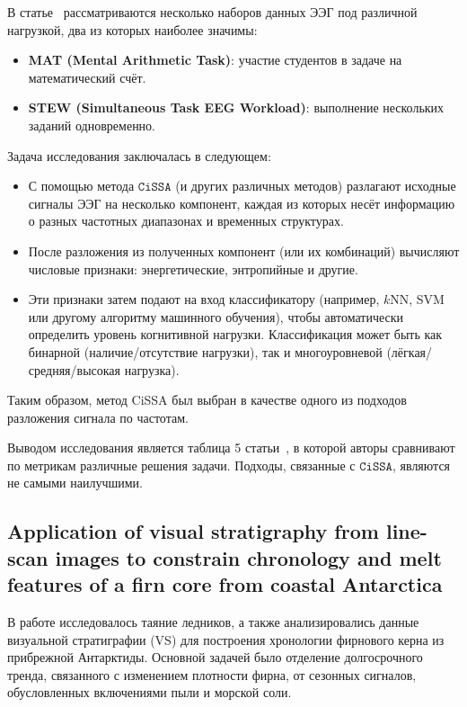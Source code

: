 \documentclass[12pt, specialist, subf
]{disser}
\theoremstyle{definition}
\newcommand{\CISSA}{\texttt{CiSSA}}
\begin{document}
В статье~\cite{cognitive} рассматриваются несколько наборов данных ЭЭГ под различной нагрузкой, два из которых наиболее значимы:

\begin{itemize}
	\item \textbf{MAT (Mental Arithmetic Task)}: участие студентов в задаче на математический счёт.
	\item \textbf{STEW (Simultaneous Task EEG Workload)}: выполнение нескольких заданий одновременно.
\end{itemize}

Задача исследования заключалась в следующем:

\begin{itemize}
	\item С помощью метода $\CISSA$ (и других различных методов) разлагают исходные сигналы ЭЭГ на несколько компонент, каждая из которых несёт информацию о разных частотных диапазонах и временных структурах.
	\item После разложения из полученных компонент (или их комбинаций) вычисляют числовые признаки: энергетические, энтропийные и другие.
	\item Эти признаки затем подают на вход классификатору (например, $k$NN, SVM или другому алгоритму машинного обучения), чтобы автоматически определить уровень когнитивной нагрузки. Классификация может быть как бинарной (наличие/отсутствие нагрузки), так и многоуровневой (лёгкая/средняя/высокая нагрузка).
\end{itemize}

Таким образом, метод CiSSA был выбран в качестве одного из подходов разложения сигнала по частотам.

Выводом исследования является таблица 5 статьи~\cite{cognitive}, в которой авторы сравнивают по метрикам различные решения задачи. Подходы, связанные с $\CISSA$, являются не самыми наилучшими.



\subsection{Application of visual stratigraphy from line-scan images to constrain chronology and melt features of a firn core from coastal Antarctica}

В работе \cite{Dey_Thamban_Laluraj_Mahalinganathan_Redkar_Kumar_Matsuoka_2023} исследовалось таяние ледников, а также анализировались данные визуальной стратиграфии (VS) для построения хронологии фирнового керна из прибрежной Антарктиды. Основной задачей было отделение долгосрочного тренда, связанного с изменением плотности фирна, от сезонных сигналов, обусловленных включениями пыли и морской соли.
\end{document}
